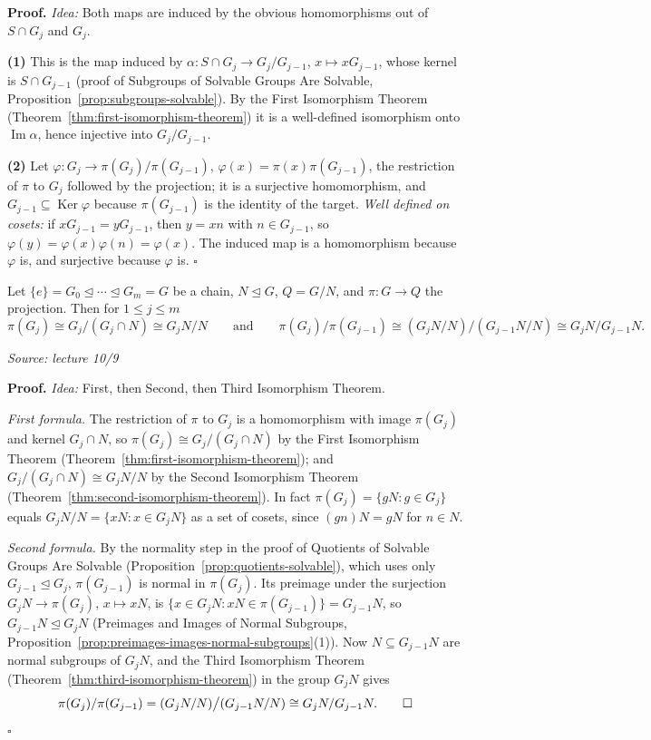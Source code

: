 \documentclass[11pt]{report}
\renewenvironment{proof}[1][Proof]{\noindent\textbf{#1.} }{\hfill$\square$\par\vspace{5pt}}
\newcommand{\srcline}[1]{\par\hfill{\footnotesize\textit{Source: #1}}}
\begin{document}
\begin{proof}
\textit{Idea:} Both maps are induced by the obvious homomorphisms out of $S \cap G_j$ and $G_j$.\par
\textbf{(1)} This is the map induced by $\alpha: S \cap G_j \to G_j/G_{j-1}$, $x \mapsto xG_{j-1}$, whose kernel is $S \cap G_{j-1}$ (proof of Subgroups of Solvable Groups Are Solvable, Proposition~\ref{prop:subgroups-solvable}). By the First Isomorphism Theorem (Theorem~\ref{thm:first-isomorphism-theorem}) it is a well-defined isomorphism onto $\operatorname{Im}\alpha$, hence injective into $G_j/G_{j-1}$.

\textbf{(2)} Let $\varphi: G_j \to \pi(G_j)/\pi(G_{j-1})$, $\varphi(x) = \pi(x)\pi(G_{j-1})$, the restriction of $\pi$ to $G_j$ followed by the projection; it is a surjective homomorphism, and $G_{j-1} \subseteq \operatorname{Ker}\varphi$ because $\pi(G_{j-1})$ is the identity of the target. \emph{Well defined on cosets:} if $xG_{j-1} = yG_{j-1}$, then $y = xn$ with $n \in G_{j-1}$, so $\varphi(y) = \varphi(x)\varphi(n) = \varphi(x)$. The induced map is a homomorphism because $\varphi$ is, and surjective because $\varphi$ is.
\end{proof}

\begin{propbox}\label{prop:image-chain-quotients-g-mod-n}
Let $\{e\} = G_0 \trianglelefteq \cdots \trianglelefteq G_m = G$ be a chain, $N \trianglelefteq G$, $Q = G/N$, and $\pi: G \to Q$ the projection. Then for $1 \leq j \leq m$ \[ \pi(G_j) \cong G_j/(G_j \cap N) \cong G_jN/N \qquad\text{and}\qquad \pi(G_j)/\pi(G_{j-1}) \cong (G_jN/N)\big/(G_{j-1}N/N) \cong G_jN/G_{j-1}N. \]
\srcline{lecture 10/9}
\end{propbox}

\begin{proof}
\textit{Idea:} First, then Second, then Third Isomorphism Theorem.\par
\emph{First formula.} The restriction of $\pi$ to $G_j$ is a homomorphism with image $\pi(G_j)$ and kernel $G_j \cap N$, so $\pi(G_j) \cong G_j/(G_j \cap N)$ by the First Isomorphism Theorem (Theorem~\ref{thm:first-isomorphism-theorem}); and $G_j/(G_j \cap N) \cong G_jN/N$ by the Second Isomorphism Theorem (Theorem~\ref{thm:second-isomorphism-theorem}). In fact $\pi(G_j) = \{gN : g \in G_j\}$ equals $G_jN/N = \{xN : x \in G_jN\}$ as a set of cosets, since $(gn)N = gN$ for $n \in N$.

\emph{Second formula.} By the normality step in the proof of Quotients of Solvable Groups Are Solvable (Proposition~\ref{prop:quotients-solvable}), which uses only $G_{j-1} \trianglelefteq G_j$, $\pi(G_{j-1})$ is normal in $\pi(G_j)$. Its preimage under the surjection $G_jN \to \pi(G_j)$, $x \mapsto xN$, is $\{x \in G_jN : xN \in \pi(G_{j-1})\} = G_{j-1}N$, so $G_{j-1}N \trianglelefteq G_jN$ (Preimages and Images of Normal Subgroups, Proposition~\ref{prop:preimages-images-normal-subgroups}(1)). Now $N \subseteq G_{j-1}N$ are normal subgroups of $G_jN$, and the Third Isomorphism Theorem (Theorem~\ref{thm:third-isomorphism-theorem}) in the group $G_jN$ gives
\[ \pi(G_j)/\pi(G_{j-1}) = (G_jN/N)\big/(G_{j-1}N/N) \cong G_jN/G_{j-1}N. \qedhere \]
\end{proof}
\end{document}
